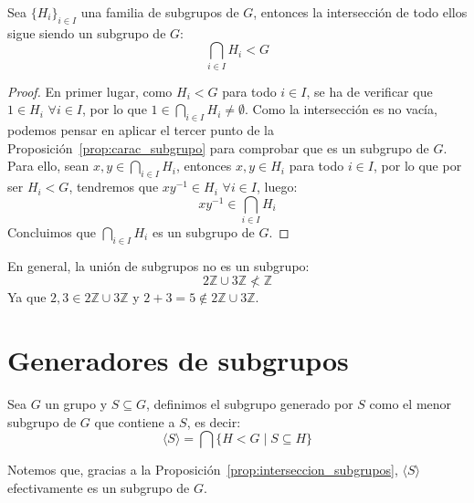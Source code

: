 \begin{prop}\label{prop:interseccion_subgrupos}
    Sea $\{H_i\}_{i \in I}$ una familia de subgrupos de $G$, entonces la intersección de todo ellos sigue siendo un subgrupo de $G$:
    \begin{equation*}
        \bigcap_{i \in I} H_i < G
    \end{equation*}
    \begin{proof}
        En primer lugar, como $H_i < G$ para todo $i \in I$, se ha de verificar que $1\in H_i$ $\forall i \in I$, por lo que $1\in \bigcap\limits_{i \in I} H_i \neq \emptyset $. Como la intersección es no vacía, podemos pensar en aplicar el tercer punto de la Proposición~\ref{prop:carac_subgrupo} para comprobar que es un subgrupo de $G$.\\

        \noindent
        Para ello, sean $x,y\in \bigcap\limits_{i \in I}H_i$, entonces $x,y\in H_i$ para todo $i \in I$, por lo que por ser $H_i < G$, tendremos que $xy^{-1}\in H_i$ $\forall i \in I$, luego:
        \begin{equation*}
            xy^{-1} \in \bigcap_{i \in I}H_i
        \end{equation*}
        Concluimos que $\bigcap\limits_{i \in I}H_i$ es un subgrupo de $G$.
    \end{proof}
\end{prop}

\begin{ejemplo}
    En general, la unión de subgrupos no es un subgrupo:
    \begin{equation*}
        2\mathbb{Z} \cup 3\mathbb{Z}  \not< \mathbb{Z}
    \end{equation*}
    Ya que $2,3\in 2\mathbb{Z}\cup 3\mathbb{Z}$ y $2+3 = 5\notin 2\mathbb{Z}\cup 3\mathbb{Z}$.
\end{ejemplo}

\section{Generadores de subgrupos}
\begin{definicion}
    Sea $G$ un grupo y $S\subseteq G$, definimos el subgrupo generado por $S$ como el menor subgrupo de $G$ que contiene a $S$, es decir:
    \begin{equation*}
        \langle S \rangle  = \bigcap \{H < G \mid S\subseteq H\}
    \end{equation*}
\end{definicion}
\begin{observacion}
    Notemos que, gracias a la Proposición~\ref{prop:interseccion_subgrupos}, $\langle S \rangle $ efectivamente es un subgrupo de $G$.
\end{observacion}

